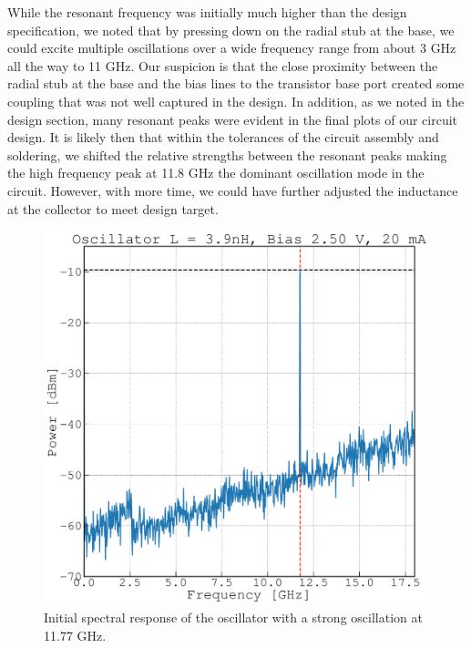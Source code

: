\documentclass{article}
\begin{document}
While the resonant frequency was initially much higher than the design specification, we noted that by pressing down on the radial stub at the base, we could excite multiple oscillations over a wide frequency range from about 3 GHz all the way to 11 GHz. Our suspicion is that the close proximity between the radial stub at the base and the bias lines to the transistor base port created some coupling that was not well captured in the design. In addition, as we noted in the design section, many resonant peaks were evident in the final plots of our circuit design. It is likely then that within the tolerances of the circuit assembly and soldering, we shifted the relative strengths between the resonant peaks making the high frequency peak at 11.8 GHz the dominant oscillation mode in the circuit. However, with more time, we could have further adjusted the inductance at the collector to meet design target.

\begin{figure}[!htbp]
    \centering
    \includegraphics[scale=0.35]{11GHz_plot.pdf}
    \caption{Initial spectral response of the oscillator with a strong oscillation at 11.77 GHz.}
    \label{fig:11GHz}
\end{figure}
\end{document}

